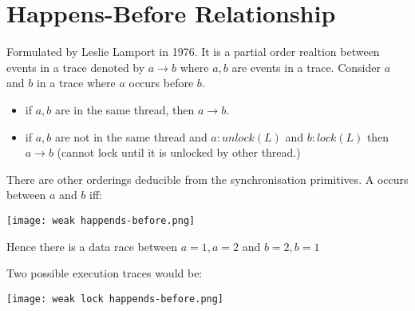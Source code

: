 \documentclass{report}
\begin{document}
\section*{Happens-Before Relationship}
Formulated by Leslie Lamport in 1976. It is a partial order realtion between events in a trace denoted by $a \to b$ where $a,b$ are events in a trace.
Consider $a$ and $b$ in a trace where $a$ occurs before $b$.
\begin{itemize}
	\item if $a,b$ are in the same thread, then $a \to b$.
	\item if $a,b$ are not in the same thread and $a : unlock(L)$ and $b : lock(L)$ then $a \to b$ (cannot lock until it is unlocked by other thread.)
\end{itemize}
There are other orderings deducible from the synchronisation primitives.
A  occurs between $a$ and $b$ iff:
\begin{minipage}{0.5 \textwidth}
\end{minipage}
\begin{minipage}{0.5 \textwidth}
\end{minipage}
\begin{center}
	\texttt{[image: weak happends-before.png]}
\end{center}
Hence there is a data race between $a = 1, a = 2$ and $b = 2, b = 1$
\\ \begin{minipage}{0.5 \textwidth}
\end{minipage}
\begin{minipage}{0.5 \textwidth}
\end{minipage}
Two possible execution traces would be:
\begin{center}
	\texttt{[image: weak lock happends-before.png]}
\end{center}
\end{document}
